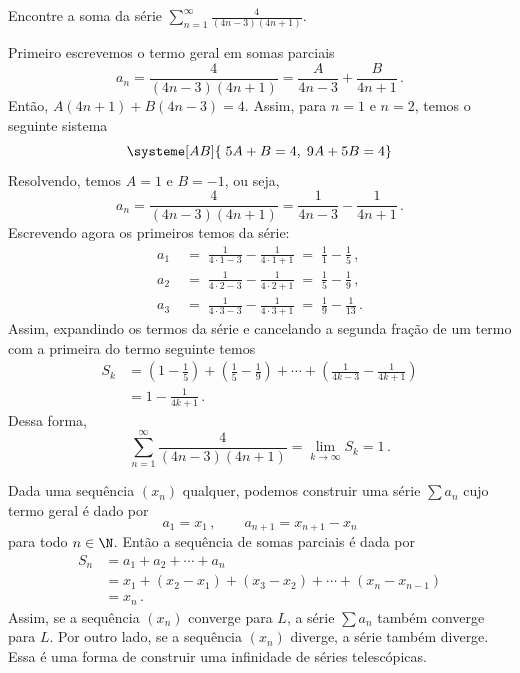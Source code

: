 \begin{example}
  Encontre a soma da série
  \(
    \sum_{n=1}^\infty \frac{4}{(4n-3)(4n+1)}
  \).

  \solution
  Primeiro escrevemos o termo geral em somas parciais
  \[
    a_n = \frac{4}{(4n-3)(4n+1)}=\frac{A}{4n-3}+\frac{B}{4n+1}   \,.
  \]
  Então, $A(4n+1)+B(4n-3)=4$. Assim, para $n=1$ e $n=2$, temos o seguinte sistema
  \[
    \systeme[AB]{ \;5A + B = 4, \;9A + 5B = 4}
  \]
  Resolvendo, temos $A=1$ e $B=-1$, ou seja,
  \[
    a_n = \frac{4}{(4n-3)(4n+1)}=\frac{1}{4n-3}-\frac{1}{4n+1}  \,.
  \]
  Escrevendo agora os primeiros temos da série:
  \begin{align*}
    a_1 & \;=\; \frac{1}{4\cdot 1-3}-\frac{1}{4\cdot 1+1} \;=\; \frac{1}{1}-\frac{1}{5}   \,,\\[2mm]
    a_2 & \;=\; \frac{1}{4\cdot 2-3}-\frac{1}{4\cdot 2+1} \;=\; \frac{1}{5}-\frac{1}{9}   \,,\\[2mm]
    a_3 & \;=\; \frac{1}{4\cdot 3-3}-\frac{1}{4\cdot 3+1} \;=\; \frac{1}{9}-\frac{1}{13}  \,.
  \end{align*}
  Assim, expandindo os termos da série e cancelando a segunda fração
  de um termo com a primeira do termo seguinte temos
  \begin{align*}
    S_k & = \left(        1       - \frac{1}{5}    \right)
          + \left( \frac{1}{5}    - \frac{1}{9}    \right) + \cdots
          + \left( \frac{1}{4k-3} - \frac{1}{4k+1} \right) \\[2mm]
        & = 1-\frac{1}{4k+1}  \,.
  \end{align*}
  Dessa forma,
  \[
    \sum_{n=1}^\infty \frac{4}{(4n-3)(4n+1)}
    = \lim_{k\to \infty} S_k
    = 1   \,.
  \]
\end{example}

Dada uma sequência $(x_n)$ qualquer, podemos construir uma série $\sum a_n$
cujo termo geral é dado por
\[
  a_1 = x_1  \,, \qquad a_{n+1} = x_{n+1}-x_n
\]
para todo $n\in \N$.
Então a sequência de somas parciais é dada por
\begin{align*}
	S_n & = a_1 + a_2 + \cdots + a_n  \\
	    & = {x_1} + ({x_2}-{x_1})
                + ({x_3}-{x_2})
                + \cdots
                + (x_n-{x_{n-1}}) \\
	    & = x_n   \,.
\end{align*}
Assim, se a sequência $(x_n)$ converge para $L$, a série $\sum a_n$ também converge para $L$.
Por outro lado, se a sequência $(x_n)$ diverge, a série também diverge.
Essa é uma forma de construir uma infinidade de séries telescópicas.

